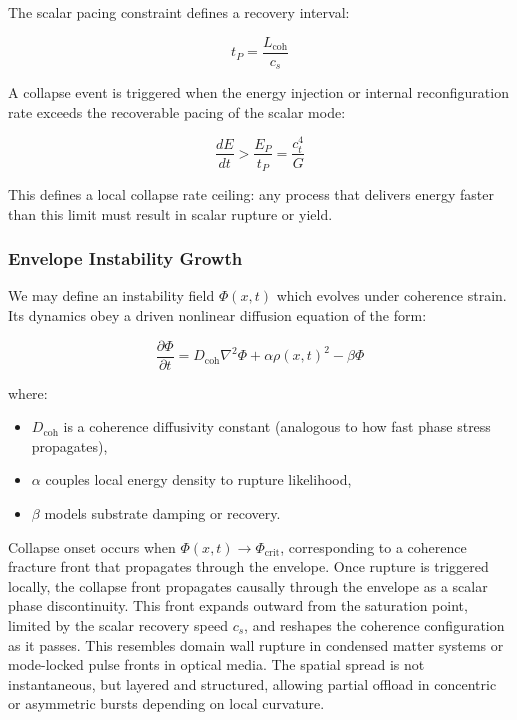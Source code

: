 \documentclass[entropy,article,submit,pdftex,moreauthors]{Definitions/mdpi}
\begin{document}
The scalar pacing constraint defines a recovery interval:

\begin{equation}
t_P = \frac{L_{\text{coh}}}{c_s}
\end{equation}

A collapse event is triggered when the energy injection or internal reconfiguration rate exceeds the recoverable pacing of the scalar mode:

\begin{equation}
\frac{dE}{dt} > \frac{E_P}{t_P} = \frac{c_t^4}{G}
\end{equation}

This defines a local collapse rate ceiling: any process that delivers energy faster than this limit must result in scalar rupture or yield.

\subsubsection{Envelope Instability Growth}

We may define an instability field $\Phi(x,t)$ which evolves under coherence strain. Its dynamics obey a driven nonlinear diffusion equation of the form:

\begin{equation}
\frac{\partial \Phi}{\partial t} = D_{\text{coh}} \nabla^2 \Phi + \alpha \rho(x,t)^2 - \beta \Phi
\end{equation}

where:
\begin{itemize}
  \item $D_{\text{coh}}$ is a coherence diffusivity constant (analogous to how fast phase stress propagates),
  \item $\alpha$ couples local energy density to rupture likelihood,
  \item $\beta$ models substrate damping or recovery.
\end{itemize}

Collapse onset occurs when $\Phi(x,t) \to \Phi_{\text{crit}}$, corresponding to a coherence fracture front that propagates through the envelope. Once rupture is triggered locally, the collapse front propagates causally through the envelope as a scalar phase discontinuity. This front expands outward from the saturation point, limited by the scalar recovery speed $c_s$, and reshapes the coherence configuration as it passes. This resembles domain wall rupture in condensed matter systems or mode-locked pulse fronts in optical media. The spatial spread is not instantaneous, but layered and structured, allowing partial offload in concentric or asymmetric bursts depending on local curvature.
\end{document}
